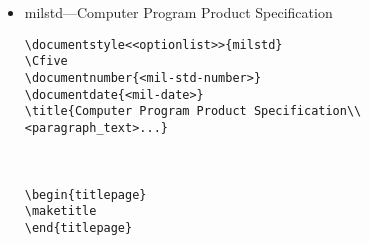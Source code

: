 \begin{itemize}
\begin{small}
\begin{verbatim}
\subsection{Test requirements.}

\subsection{Acceptance test requirements.}

\section{PREPARATION FOR DELIVERY}

\section{NOTES}

\appendix
%
% \section will now generate appendices starting with section 10, 20, etc.
%
\section{<text>} % Section 10, Appendix I

\section{<text>} % Section 20, Appendix II


\end{verbatim}
\end{small}

\item milstd---Computer Program Product Specification 

\begin{small}
\begin{verbatim}
\documentstyle<<optionlist>>{milstd}
\Cfive
\documentnumber{<mil-std-number>}
\documentdate{<mil-date>}
\title{Computer Program Product Specification\\
<paragraph_text>...}



\begin{titlepage}
\maketitle
\end{titlepage}


\end{verbatim}
\end{small}
\end{itemize}
